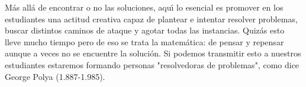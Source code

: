 \documentclass[a4paper,spanish]{article}
\begin{document}
M\'{a}s all\'{a} de encontrar o no las soluciones, aqu\'{\i} lo esencial es
promover en los estudiantes una actitud creativa capaz de plantear e
intentar resolver problemas, buscar distintos caminos de ataque y agotar
todas las instancias. Quiz\'{a}s esto lleve mucho tiempo pero de eso se
trata la matem\'{a}tica: de pensar y repensar aunque a veces no se encuentre
la soluci\'{o}n. Si podemos transmitir esto a nuestros estudiantes estaremos
formando personas "resolvedoras de problemas", como dice George Polya
(1.887-1.985).
\end{document}
